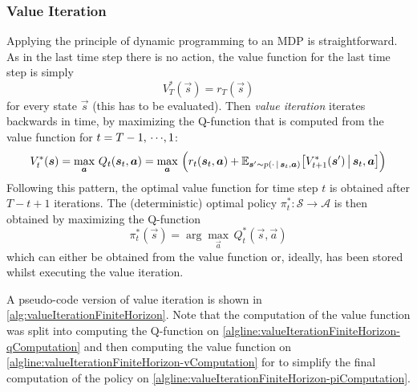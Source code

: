 			\subsubsection{Value Iteration}
				Applying the principle of dynamic programming to an MDP is straightforward. As in the last time step there is no action, the value function for the last time step is simply
				\begin{equation*}
					V_T^\ast(\vec{s}) = r_T(\vec{s})
				\end{equation*}
				for every state \(\vec{s}\) (this has to be evaluated). Then \emph{value iteration} iterates backwards in time, by maximizing the Q-function that is computed from the value function for \( t = T - 1,\,\cdots\!,1 \):
				\begin{equation*}
					V_t^\ast(\bm{s}) = \max_{\bm{a}} \, Q_t(\bm{s}_t, \bm{a}) = \max_{\bm{a}} \, \Big( r_t(\bm{s}_t, \bm{a}) + \mathbb{E}_{\bm{s}' \sim p(\cdot \,\vert\, \bm{s}_t, \bm{a})}\big[ V_{t + 1}^\ast(\bm{s}') \,\big\vert\, \bm{s}_t, \bm{a} \big] \Big)
				\end{equation*}
				Following this pattern, the optimal value function for time step \(t\) is obtained after \( T - t + 1 \) iterations. The (deterministic) optimal policy \( \pi_t^\ast : \mathcal{S} \to \mathcal{A} \) is then obtained by maximizing the Q-function
				\begin{equation*}
					\pi_t^\ast(\vec{s}) = \arg\max_{\vec{a}} \, Q_t^\ast(\vec{s}, \vec{a})
				\end{equation*}
				which can either be obtained from the value function or, ideally, has been stored whilst executing the value iteration.

				A pseudo-code version of value iteration is shown in \autoref{alg:valueIterationFiniteHorizon}. Note that the computation of the value function was split into computing the Q-function on \autoref{algline:valueIterationFiniteHorizon-qComputation} and then computing the value function on \autoref{algline:valueIterationFiniteHorizon-vComputation} for to simplify the final computation of the policy on \autoref{algline:valueIterationFiniteHorizon-piComputation}.

